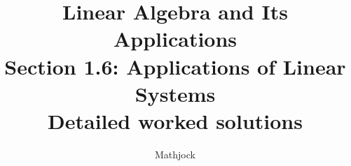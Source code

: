 
\title{\textbf{Linear Algebra and Its Applications}\\[0.3em]Section 1.6: Applications of Linear Systems\\[0.3em]\large Detailed worked solutions}
\author{Mathjock}
\date{}

\maketitle
\bookinfo
\tableofcontents
\clearpage
\renewcommand{\thesection}{1.\arabic{section}}
\renewcommand{\theHsection}{1.\arabic{section}}
\setcounter{section}{5}


